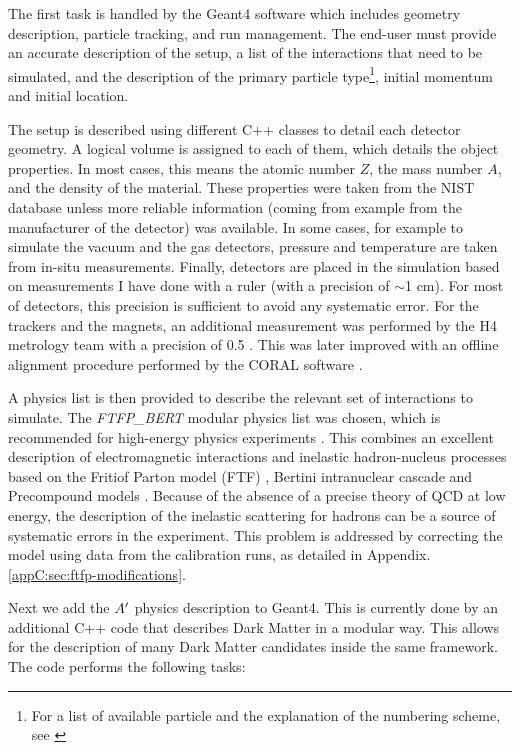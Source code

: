 The first task is handled by the Geant4 software\cite{AGOSTINELLI2003250} which includes geometry description, particle tracking, and run management. The end-user must provide an accurate description of the setup, a list of the interactions that need to be simulated, and the description of the primary particle type\footnote{For a list of available particle and the explanation of the numbering scheme, see \cite{geant4-pdg}}, initial momentum and initial location.

The setup is described using different C++ classes to detail each detector geometry. A logical volume is assigned to each of them, which details the object properties. In most cases, this means the atomic number $Z$, the mass number $A$, and the density of the material. These properties were taken from the NIST database \cite{nist-database} unless more reliable information (coming from example from the manufacturer of the detector) was available. In some cases, for example to simulate the vacuum and the gas detectors, pressure and temperature are taken from in-situ measurements. Finally, detectors are placed in the simulation based on measurements I have done with a ruler (with a precision of $\sim$1 \si{\centi\meter}). For most of detectors, this precision is sufficient to avoid any systematic error. For the trackers and the magnets, an additional measurement was performed by the H4 metrology team with a precision of 0.5 \mmi \cite{meterology-measurements}. This was later improved with an offline alignment procedure performed by the CORAL software \cite{ABBON2007455}. 

A physics list is then provided to describe the relevant set of interactions to simulate. The \textit{\textrm{FTFP\_BERT}} modular physics list was chosen, which is recommended for high-energy physics experiments \cite{ALLISON2016186}. This combines an excellent description of electromagnetic interactions and inelastic hadron-nucleus processes based on the Fritiof Parton model (FTF) \cite{Uzhinsky:2013hea}, Bertini intranuclear cascade \cite{Heikkinen:2003sc} and Precompound models \cite{Apostolakis:2009zz}. Because of the absence of a precise theory of QCD at low energy, the description of the inelastic scattering for hadrons can be a source of systematic errors in the experiment. This problem is addressed by correcting the model using data from the calibration runs, as detailed in Appendix.\ref{appC:sec:ftfp-modifications}.

Next we add the $A'$ physics description to Geant4. This is currently done by an additional C++ code that describes Dark Matter in a modular way. This allows for the description of many Dark Matter candidates inside the same framework. The code performs the following tasks:

